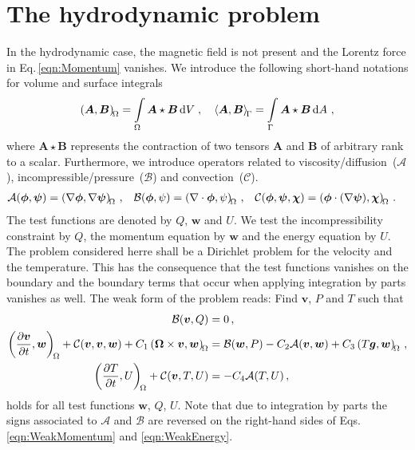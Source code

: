 \section{The hydrodynamic problem}
In the hydrodynamic case, the magnetic field is not present and the Lorentz force in Eq.\,\eqref{eqn:Momentum} vanishes. We introduce the following short-hand notations for volume and surface integrals
\begin{equation*}
	\left(\bm A, \bm B\right)_{\!{\Omega}} = \int\limits_{\Omega} \bm A \star \bm B\, \mathrm{d}V \; , \quad
	\left\langle\bm A, \bm B\right\rangle_{\!{\Gamma}}  = \int\limits_{\Gamma} \bm A \star \bm B\, \mathrm{d}A \ ,
\end{equation*}
where $\bm A \star \bm B$ represents the contraction of two tensors $\bm A$ and $\bm B$ of arbitrary rank to a scalar. Furthermore, we introduce operators related to viscosity/diffusion~($\mathcal{A}$), incompressible/pressure~($\mathcal{B}$) and convection~($\mathcal{C}$).
\begin{align*}
\begin{aligned}
	\mathcal{A}(\bm{\phi}, \bm{\psi})&=\left(\nabla\bm{\phi}, \nabla\bm{\psi}\right)_{\!{\Omega}}\,, &
	\mathcal{B}(\bm{\phi}, \psi)&=\left(\nabla\cdot\bm{\phi}, \psi\right)_{\!{\Omega}}\,, &
	\mathcal{C}(\bm{\phi}, \bm{\psi}, \bm{\chi})&=\left(\bm{\phi} \cdot (\nabla\bm{\psi}), \bm{\chi}\right)_{\!{\Omega}}\,.
\end{aligned}
\end{align*}
The test functions are denoted by $Q$, $\bm{w}$ and $U$. We test the incompressibility constraint by $Q$, the momentum equation by $\bm{w}$ and the energy equation by $U$. The problem considered herre shall be a Dirichlet problem for the velocity and the temperature. This has the consequence that the test functions vanishes on the boundary and the boundary terms that occur when applying integration by parts vanishes as well. The weak form of the problem reads: Find $\bm{v}$, $P$ and $T$ such that
\begin{align}
	\mathcal{B}(\bm{v}, Q)&=0\,,\label{eqn:WeakIncompressibility} \\
	\left(\frac{\partial \bm{v}}{\partial t}, \bm{w}\right)_{\!{\Omega}}+\mathcal{C}(\bm{v}, \bm{v}, \bm{w})+C_1\left(\bm{\Omega}\times\bm{v}, \bm{w}\right)_{\!{\Omega}}&=\mathcal{B}(\bm{w}, P)-C_2\mathcal{A}(\bm{v}, \bm{w})+C_3\left(T\bm{g}, \bm{w}\right)_{\!{\Omega}}\,,\label{eqn:WeakMomentum}\\
	\left(\frac{\partial T}{\partial t}, U\right)_{\!{\Omega}}+\mathcal{C}(\bm{v}, T, U)&=-C_4\mathcal{A}(T, U)\,,
	\label{eqn:WeakEnergy}
\end{align}
holds for all test functions $\bm{w}$, $Q$, $U$. Note that due to integration by parts the signs associated to $\mathcal{A}$ and $\mathcal{B}$ are reversed on the right-hand sides of Eqs.\,\eqref{eqn:WeakMomentum} and \eqref{eqn:WeakEnergy}.

